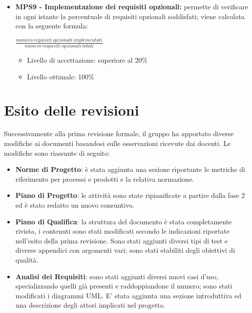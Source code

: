 \begin{itemize}
	 \item \textbf{MPS9 - Implementazione dei requisiti opzionali:} permette di verificare in ogni istante la percentuale di requisiti opzionali soddisfati; viene calcolata con la seguente formula: 
		\begin{center}
		$\frac{numero\ requisiti\ opzionali\ implementati}{numero\ requisiti\ opzionali\ totali}$
	\end{center}
	\begin{itemize}
	 \item Livello di accettazione: superiore al 20\%
	 \item Livello ottimale: 100\%
	 \end{itemize}
	
	\end{itemize}
	
\newpage
\section{Esito delle revisioni}
Successivamente alla prima revisione formale, il gruppo ha apportato diverse modifiche ai documenti basandosi sulle osservazioni ricevute dai docenti. Le modifiche sono riassunte di seguito:
	\begin{itemize}
		\item \textbf{Norme di Progetto}: è stata aggiunta una sezione riportante le metriche di riferimento per processi e prodotti e la relativa normazione. 
		\item \textbf{Piano di Progetto}: le attività sono state ripianificate a partire dalla fase 2 ed è stato redatto un nuovo consuntivo.
		\item \textbf{Piano di Qualifica}: la struttura del documento è stata completamente rivista, i contenuti sono stati modificati secondo le indicazioni riportate nell'esito della prima revisione. Sono stati aggiunti diversi tipi di test e diverse appendici con argomenti vari; sono stati stabiliti degli obiettivi di qualità.
		\item \textbf{Analisi dei Requisiti}: sono stati aggiunti diversi nuovi casi d'uso, specializzando quelli già presenti e raddoppiandone il numero; sono stati modificati i diagrammi UML. E' stata aggiunta una sezione introduttiva ed una descrizione degli attori implicati nel progetto. 
	\end{itemize}
	
	
\newpage
